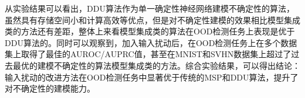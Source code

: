 从实验结果可以看出，DDU算法作为单一确定性神经网络建模不确定性的算法，虽然具有存储空间小和计算高效等优点，但是对不确定性建模的效果相比模型集成类的方法还有差距，整体上来看模型集成类的算法在OOD检测任务上表现是优于DDU算法的。同时可以观察到，加入输入扰动后，在OOD检测任务上在多个数据集上取得了最佳的AUROC/AUPRC值，甚至在MNIST和SVHN数据集上超过了过去最优的建模不确定性的算法模型集成类的方法。综合实验结果，可以得出结论：输入扰动的改进方法在OOD检测任务中显著优于传统的MSP和DDU算法，提升了对不确定性的建模能力。

